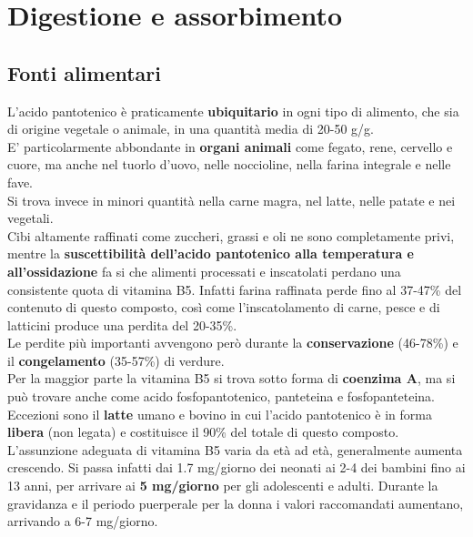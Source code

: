\documentclass[a4paper, 12pt]{article}
\begin{document}
\section{Digestione e assorbimento}

\subsection{Fonti alimentari}
L’acido pantotenico è praticamente \textbf{ubiquitario} in ogni tipo di alimento, che sia di origine vegetale o animale, in una quantità media di 20-50 {\textmu}g/g.\\
E’ particolarmente abbondante in \textbf{organi animali} come fegato, rene, cervello e cuore, ma anche nel tuorlo d’uovo, nelle noccioline, nella farina integrale e nelle fave.\\
Si trova invece in minori quantità nella carne magra, nel latte, nelle patate e nei vegetali.\\
Cibi altamente raffinati come zuccheri, grassi e oli ne sono completamente privi, mentre la \textbf{suscettibilità dell’acido pantotenico alla temperatura e all’ossidazione} fa si che alimenti processati  e inscatolati perdano una consistente quota di vitamina B5. Infatti farina raffinata perde fino al 37-47\% del contenuto di questo composto, così come l’inscatolamento di carne, pesce e di latticini produce una perdita del 20-35\%.\\
Le perdite più importanti avvengono però durante la \textbf{conservazione} (46-78\%) e il \textbf{congelamento} (35-57\%) di verdure.\\
Per la maggior parte la vitamina B5 si trova sotto forma di \textbf{coenzima A}, ma si può trovare anche come acido fosfopantotenico, panteteina e fosfopanteteina. Eccezioni sono il \textbf{latte} umano e bovino in cui l’acido pantotenico è in forma \textbf{libera} (non legata) e costituisce il 90\% del totale di questo composto.\\
L’assunzione adeguata di vitamina B5 varia da età ad età, generalmente aumenta crescendo. Si passa infatti dai 1.7 mg/giorno dei neonati ai 2-4 dei bambini fino ai 13 anni, per arrivare ai \textbf{5 mg/giorno} per gli adolescenti e adulti. Durante la gravidanza e il periodo puerperale per la donna i valori raccomandati aumentano, arrivando a 6-7 mg/giorno.
\end{document}
